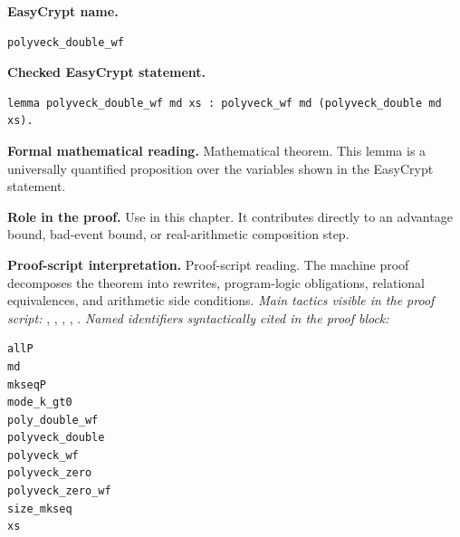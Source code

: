 \begin{formaltheorem}
\noindent\textbf{EasyCrypt name.}
\begin{lstlisting}[language=EasyCrypt,basicstyle=\ttfamily\scriptsize]
polyveck_double_wf
\end{lstlisting}
\noindent\textbf{Checked EasyCrypt statement.}
\begin{lstlisting}[language=EasyCrypt,basicstyle=\ttfamily\scriptsize]
lemma polyveck_double_wf md xs : polyveck_wf md (polyveck_double md xs).
\end{lstlisting}
\noindent\textbf{Formal mathematical reading.}
Mathematical theorem. This lemma is a universally quantified proposition over the variables shown in the EasyCrypt statement.

\noindent\textbf{Role in the proof.}
Use in this chapter. It contributes directly to an advantage bound, bad-event bound, or real-arithmetic composition step.

\noindent\textbf{Proof-script interpretation.}
Proof-script reading. The machine proof decomposes the theorem into rewrites, program-logic obligations, relational equivalences, and arithmetic side conditions.
\emph{Main tactics visible in the proof script:} , , , , .
\emph{Named identifiers syntactically cited in the proof block:}
\begin{lstlisting}[language=EasyCrypt,basicstyle=\ttfamily\scriptsize]
allP
md
mkseqP
mode_k_gt0
poly_double_wf
polyveck_double
polyveck_wf
polyveck_zero
polyveck_zero_wf
size_mkseq
xs
\end{lstlisting}

\end{formaltheorem}

